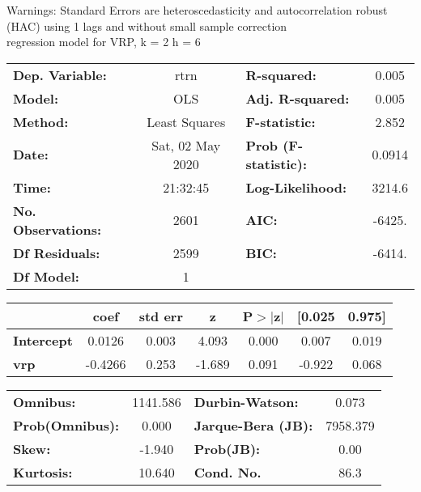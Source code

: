 Warnings: \newline
 [1] Standard Errors are heteroscedasticity and autocorrelation robust (HAC) using 1 lags and without small sample correction\\ 

regression model for VRP, k = 2 h = 6\begin{center}
\begin{tabular}{lclc}
\toprule
\textbf{Dep. Variable:}    &       rtrn       & \textbf{  R-squared:         } &     0.005   \\
\textbf{Model:}            &       OLS        & \textbf{  Adj. R-squared:    } &     0.005   \\
\textbf{Method:}           &  Least Squares   & \textbf{  F-statistic:       } &     2.852   \\
\textbf{Date:}             & Sat, 02 May 2020 & \textbf{  Prob (F-statistic):} &   0.0914    \\
\textbf{Time:}             &     21:32:45     & \textbf{  Log-Likelihood:    } &    3214.6   \\
\textbf{No. Observations:} &        2601      & \textbf{  AIC:               } &    -6425.   \\
\textbf{Df Residuals:}     &        2599      & \textbf{  BIC:               } &    -6414.   \\
\textbf{Df Model:}         &           1      & \textbf{                     } &             \\
\bottomrule
\end{tabular}
\begin{tabular}{lcccccc}
                   & \textbf{coef} & \textbf{std err} & \textbf{z} & \textbf{P$> |$z$|$} & \textbf{[0.025} & \textbf{0.975]}  \\
\midrule
\textbf{Intercept} &       0.0126  &        0.003     &     4.093  &         0.000        &        0.007    &        0.019     \\
\textbf{vrp}       &      -0.4266  &        0.253     &    -1.689  &         0.091        &       -0.922    &        0.068     \\
\bottomrule
\end{tabular}
\begin{tabular}{lclc}
\textbf{Omnibus:}       & 1141.586 & \textbf{  Durbin-Watson:     } &    0.073  \\
\textbf{Prob(Omnibus):} &   0.000  & \textbf{  Jarque-Bera (JB):  } & 7958.379  \\
\textbf{Skew:}          &  -1.940  & \textbf{  Prob(JB):          } &     0.00  \\
\textbf{Kurtosis:}      &  10.640  & \textbf{  Cond. No.          } &     86.3  \\
\bottomrule
\end{tabular}
\end{center}

